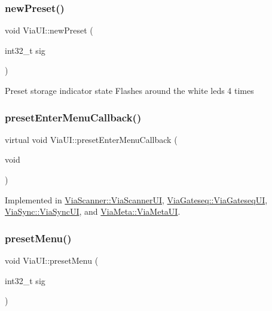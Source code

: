 \subsubsection{\texorpdfstring{new\+Preset()}{newPreset()}}
{\footnotesize\ttfamily void Via\+U\+I\+::new\+Preset (\begin{DoxyParamCaption}\item[{int32\+\_\+t}]{sig }\end{DoxyParamCaption})}

Preset storage indicator state Flashes around the white leds 4 times \mbox{\label{class_via_u_i_ad4dfd9fa424267358cab83bec4ee1f23}} 
\subsubsection{\texorpdfstring{preset\+Enter\+Menu\+Callback()}{presetEnterMenuCallback()}}
{\footnotesize\ttfamily virtual void Via\+U\+I\+::preset\+Enter\+Menu\+Callback (\begin{DoxyParamCaption}\item[{void}]{ }\end{DoxyParamCaption})\hspace{0.3cm}{\ttfamily [pure virtual]}}



Implemented in \mbox{\hyperlink{class_via_scanner_1_1_via_scanner_u_i_ac67240d1c9ebc47569185776d9d4403b}{Via\+Scanner\+::\+Via\+Scanner\+UI}}, \mbox{\hyperlink{class_via_gateseq_1_1_via_gateseq_u_i_af0d1fcd037084b122f68ea1522080fd7}{Via\+Gateseq\+::\+Via\+Gateseq\+UI}}, \mbox{\hyperlink{class_via_sync_1_1_via_sync_u_i_a390deaa64d96fa447720294817149dde}{Via\+Sync\+::\+Via\+Sync\+UI}}, and \mbox{\hyperlink{class_via_meta_1_1_via_meta_u_i_a21cd6b42537b8abe34cfe65258455991}{Via\+Meta\+::\+Via\+Meta\+UI}}.

\mbox{\label{class_via_u_i_a5a2d75e2625e2b55f0588ba8925fe45f}} 
\subsubsection{\texorpdfstring{preset\+Menu()}{presetMenu()}}
{\footnotesize\ttfamily void Via\+U\+I\+::preset\+Menu (\begin{DoxyParamCaption}\item[{int32\+\_\+t}]{sig }\end{DoxyParamCaption})}

